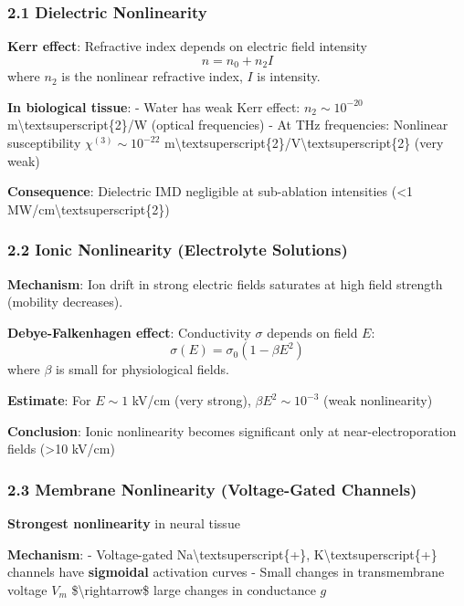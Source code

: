 \subsubsection{2.1 Dielectric
Nonlinearity}\label{dielectric-nonlinearity}

\textbf{Kerr effect}: Refractive index depends on electric field
intensity \[n = n_0 + n_2 I\] where \(n_2\) is the nonlinear refractive
index, \(I\) is intensity.

\textbf{In biological tissue}: - Water has weak Kerr effect:
\(n_2 \sim 10^{-20}\) m\textbackslash textsuperscript\{2\}/W (optical
frequencies) - At THz frequencies: Nonlinear susceptibility
\(\chi^{(3)} \sim 10^{-22}\)
m\textbackslash textsuperscript\{2\}/V\textbackslash textsuperscript\{2\}
(very weak)

\textbf{Consequence}: Dielectric IMD negligible at sub-ablation
intensities (\textless1 MW/cm\textbackslash textsuperscript\{2\})

\subsubsection{2.2 Ionic Nonlinearity (Electrolyte
Solutions)}\label{ionic-nonlinearity-electrolyte-solutions}

\textbf{Mechanism}: Ion drift in strong electric fields saturates at
high field strength (mobility decreases).

\textbf{Debye-Falkenhagen effect}: Conductivity \(\sigma\) depends on
field \(E\): \[\sigma(E) = \sigma_0 (1 - \beta E^2)\] where \(\beta\) is
small for physiological fields.

\textbf{Estimate}: For \(E \sim 1\) kV/cm (very strong),
\(\beta E^2 \sim 10^{-3}\) (weak nonlinearity)

\textbf{Conclusion}: Ionic nonlinearity becomes significant only at
near-electroporation fields (\textgreater10 kV/cm)

\subsubsection{2.3 Membrane Nonlinearity (Voltage-Gated
Channels)}\label{membrane-nonlinearity-voltage-gated-channels}

\textbf{Strongest nonlinearity} in neural tissue

\textbf{Mechanism}: - Voltage-gated
Na\textbackslash textsuperscript\{+\},
K\textbackslash textsuperscript\{+\} channels have \textbf{sigmoidal}
activation curves - Small changes in transmembrane voltage \(V_m\)
\$\textbackslash rightarrow\$ large changes in conductance \(g\)

